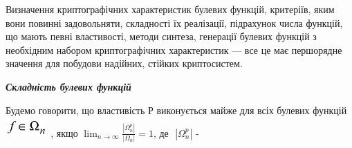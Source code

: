 \bigskip


\bigskip

Визначення криптографічних характеристик булевих функцій, критеріїв, яким вони
повинні задовольняти, складності їх реалізації,  підрахунок  числа функцій, що
мають певні властивості, методи синтеза, генерації булевих функцій з необхідним
набором криптографічних характеристик --- все це має першорядне значення для
побудови надійних, стійких криптосистем.


\bigskip


\bigskip

{\centering\bfseries\itshape
Складність булевих функцій
\par}


\bigskip


\bigskip

Будемо говорити, що властивість Р виконується майже для всіх булевих функцій 
\includegraphics[width=0.6311in,height=0.2972in]{crypt-img/crypt-img169.png} ,
якщо  $\lim_{n \to \infty}\frac{|\Omega
_n^{p}|}{|\Omega _n|}=1$, де  $ $ $|\Omega _n^{p}|$ -
